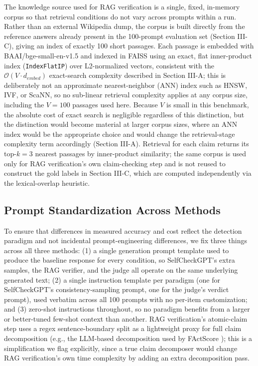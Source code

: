 \documentclass[conference]{IEEEtran}
\begin{document}
The knowledge source used for RAG verification is a single, fixed, in-memory corpus so that retrieval conditions do not vary across prompts within a run. Rather than an external Wikipedia dump, the corpus is built directly from the reference answers already present in the 100-prompt evaluation set (Section III-C), giving an index of exactly 100 short passages. Each passage is embedded with BAAI/bge-small-en-v1.5 and indexed in FAISS using an exact, flat inner-product index (\texttt{IndexFlatIP}) over L2-normalized vectors, consistent with the $\mathcal{O}(V \cdot d_{embed})$ exact-search complexity described in Section III-A; this is deliberately not an approximate nearest-neighbor (ANN) index such as HNSW, IVF, or ScaNN, so no sub-linear retrieval complexity applies at any corpus size, including the $V=100$ passages used here. Because $V$ is small in this benchmark, the absolute cost of exact search is negligible regardless of this distinction, but the distinction would become material at larger corpus sizes, where an ANN index would be the appropriate choice and would change the retrieval-stage complexity term accordingly (Section III-A). Retrieval for each claim returns its top-$k{=}3$ nearest passages by inner-product similarity; the same corpus is used only for RAG verification's own claim-checking step and is not reused to construct the gold labels in Section III-C, which are computed independently via the lexical-overlap heuristic.

\subsection{Prompt Standardization Across Methods}

To ensure that differences in measured accuracy and cost reflect the detection paradigm and not incidental prompt-engineering differences, we fix three things across all three methods: (1) a single generation prompt template used to produce the baseline response for every condition, so SelfCheckGPT's extra samples, the RAG verifier, and the judge all operate on the same underlying generated text; (2) a single instruction template per paradigm (one for SelfCheckGPT's consistency-sampling prompt, one for the judge's verdict prompt), used verbatim across all 100 prompts with no per-item customization; and (3) zero-shot instructions throughout, so no paradigm benefits from a larger or better-tuned few-shot context than another. RAG verification's atomic-claim step uses a regex sentence-boundary split as a lightweight proxy for full claim decomposition (e.g., the LLM-based decomposition used by FActScore \cite{min2023factscore}); this is a simplification we flag explicitly, since a true claim decomposer would change RAG verification's own time complexity by adding an extra decomposition pass.
\end{document}
